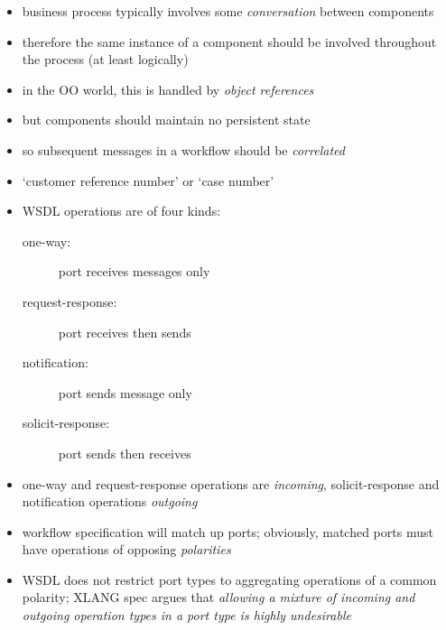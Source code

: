 \documentclass{sepslide-soa-faked} %
\begin{document}
\begin{slide}
\begin{itemize}
\item business process typically involves some \emph{conversation} between
components 
\item therefore the same instance of a component should be involved
throughout the process (at least logically)
\item in the OO world, this is handled by \emph{object references}
\item but components should maintain no persistent state
\item so subsequent messages in a workflow should be \emph{correlated}
\item `customer reference number' or `case number'
\end{itemize}
\end{slide}

\begin{slide}
\begin{itemize}
\item WSDL operations are of four kinds:
  \begin{description}
  \item[one-way:] port receives  messages only
  \item[request-response:] port receives  then 
    sends~
  \item[notification:] port sends  message only
  \item[solicit-response:] port sends  then
    receives~
  \end{description}
\item one-way and request-response operations are \emph{incoming},
  solicit-response and notification operations \emph{outgoing}
\item workflow specification will match up ports; obviously, matched ports
  must have operations of opposing \emph{polarities}
\item WSDL does not restrict port types to aggregating operations of
  a common polarity;
  XLANG spec argues that \emph{allowing a mixture of incoming and
    outgoing operation types in a port type is highly undesirable}
\end{itemize}
\end{slide}
\end{document}
